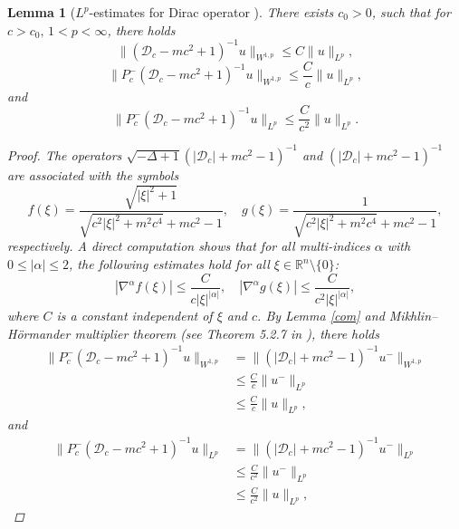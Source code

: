 \documentclass{amsart}
\theoremstyle{plain}
\newtheorem{lemma}[theorem]{Lemma}
\theoremstyle{definition}
\theoremstyle{remark}
\numberwithin{equation}{section} \numberwithin{figure}{section}
\begin{document}
\begin{lemma}[$L^p$-estimates for Dirac operator  ]\label{new_lpp}
  There exists $c_0>0$, such that for $c>c_0,\,1<p<\infty$, there holds
  \begin{equation}\label{new_lp1}
    \| (\mathscr{D}_c- mc^2 + 1)^{-1} u\|_{W^{1,p}}\leq  C   \|u\|_{L^p},
  \end{equation}
 \begin{equation}\label{new_lp2}
  \|P_c^- (\mathscr{D}_c- mc^2 + 1)^{-1} u\|_{W^{1,p}}\leq \frac{ C  }{c}\|u\|_{L^p},
 \end{equation}
  and 
  \begin{equation}\label{new_lp3}
    \|P_c^- (\mathscr{D}_c- mc^2 + 1)^{-1} u\|_{L^p}\leq \frac{ C  }{c^2}\|u\|_{L^p}.
  \end{equation}
\begin{proof}
  The operators \({\sqrt{-\Delta+1}}\left(|\mathscr{D}_c|+ mc^2 - 1\right)^{-1}\) and
   \(\left({|\mathscr{D}_c|+ mc^2 - 1}\right)^{-1}\) are associated with the symbols  
\[
f(\xi)=\frac{\sqrt{|\xi|^2+1}}{\sqrt{c^2|\xi|^2+ m^2c^4}+mc^2-1}, \quad g(\xi)=\frac{1}{\sqrt{c^2|\xi|^2+ m^2c^4}+mc^2-1},
\]
respectively. A direct computation shows that for all multi-indices \(\alpha\) with \(0 \leq |\alpha| \leq 2\), the following estimates hold for all \(\xi \in \mathbb{R}^{n} \setminus \{0\}\):
\[
|\nabla^{\alpha}f(\xi)| \leq \frac{C}{c|\xi|^{|\alpha|}}, \quad |\nabla^{\alpha}g(\xi)| \leq \frac{C}{c^2|\xi|^{|\alpha|}},
\]
where \(C\) is a constant independent of \(\xi\) and \(c\). By Lemma \ref{com} and
Mikhlin–Hörmander multiplier theorem (see Theorem 5.2.7 in \cite{MR3243734}),
there holds
\begin{equation*}
  \begin{split}
    \|P_c^- (\mathscr{D}_c- mc^2 + 1)^{-1} u\|_{W^{1,p}}
    &=\| (|\mathscr{D}_c|+ mc^2 - 1)^{-1} u^-\|_{W^{1,p}}\\
    &\leq \frac{ C  }{c}\|u^-\|_{L^p}\\
    & \leq \frac{ C  }{c}\|u\|_{L^p},
  \end{split}
\end{equation*}
and 
\begin{equation*}
  \begin{split}
    \|P_c^- (\mathscr{D}_c- mc^2 + 1)^{-1} u\|_{L^p}
    &=\| (|\mathscr{D}_c|+ mc^2 - 1)^{-1} u^-\|_{L^p}\\
    &\leq \frac{ C  }{c^2}\|u^-\|_{L^p}\\
    & \leq \frac{ C  }{c^2}\|u\|_{L^p},
  \end{split}

\end{equation*}
\end{proof}
\end{lemma}
\end{document}

